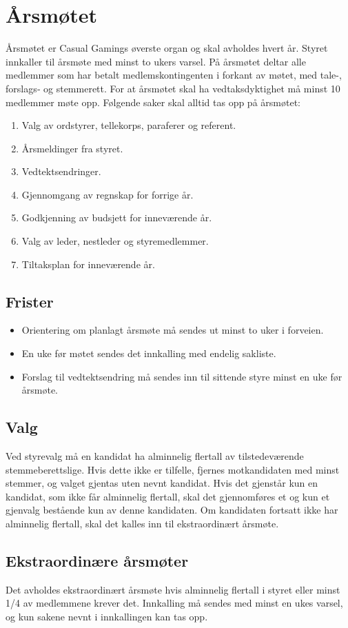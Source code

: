 \chapter{Årsmøtet}
Årsmøtet er Casual Gamings øverste organ og skal avholdes hvert år. Styret innkaller til årsmøte med minst to ukers varsel. På årsmøtet deltar alle medlemmer som har betalt medlemskontingenten i forkant av møtet, med tale-, forslags‐ og stemmerett. For at årsmøtet skal ha vedtaksdyktighet må minst 10 medlemmer møte opp. Følgende saker skal alltid tas opp på årsmøtet:
\begin{enumerate}
    \item Valg av ordstyrer, tellekorps, paraferer og referent.
    \item Årsmeldinger fra styret.
    \item Vedtektsendringer.
    \item Gjennomgang av regnskap for forrige år.
    \item Godkjenning av budsjett for inneværende år.
    \item Valg av leder, nestleder og styremedlemmer.
    \item Tiltaksplan for inneværende år.
\end{enumerate}

\section{Frister}
\begin{itemize}
    \item Orientering om planlagt årsmøte må sendes ut minst to uker i forveien.
    \item En uke før møtet sendes det innkalling med endelig sakliste.
    \item Forslag til vedtektsendring må sendes inn til sittende styre minst en uke før årsmøte.
\end{itemize}

\section{Valg}
Ved styrevalg må en kandidat ha alminnelig flertall av tilstedeværende stemmeberettslige. Hvis dette ikke er tilfelle, fjernes motkandidaten med minst stemmer, og valget gjentas uten nevnt kandidat. Hvis det gjenstår kun en kandidat, som ikke får alminnelig flertall, skal det gjennomføres et og kun et gjenvalg bestående kun av denne kandidaten. Om kandidaten fortsatt ikke har alminnelig flertall, skal det kalles inn til ekstraordinært årsmøte.

\section{Ekstraordinære årsmøter}
Det avholdes ekstraordinært årsmøte hvis alminnelig flertall i styret eller minst 1/4 av medlemmene krever det. Innkalling må sendes med minst en ukes varsel, og kun sakene nevnt i innkallingen kan tas opp.
